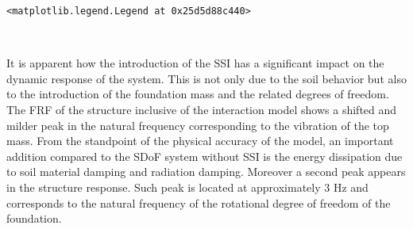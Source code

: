 \documentclass[11pt]{article}
\makeatletter
\newcommand{\boxspacing}{\kern\kvtcb@left@rule\kern\kvtcb@boxsep}
\newcommand{\prompt}[4]{
        {\ttfamily\llap{{\color{#2}[#3]:\hspace{3pt}#4}}\vspace{-\baselineskip}}
    }
\makeatother
\begin{document}
            \begin{tcolorbox}[breakable, size=fbox, boxrule=.5pt, pad at break*=1mm, opacityfill=0]
\prompt{Out}{outcolor}{5}{\boxspacing}
\begin{Verbatim}[commandchars=\\\{\}]
<matplotlib.legend.Legend at 0x25d5d88c440>
\end{Verbatim}
\end{tcolorbox}
        
    \begin{center}
    \end{center}
    { \hspace*{\fill} \\}
    
    It is apparent how the introduction of the SSI has a significant impact
on the dynamic response of the system. This is not only due to the soil
behavior but also to the introduction of the foundation mass and the
related degrees of freedom. The FRF of the structure inclusive of the
interaction model shows a shifted and milder peak in the natural
frequency corresponding to the vibration of the top mass. From the
standpoint of the physical accuracy of the model, an important addition
compared to the SDoF system without SSI is the energy dissipation due to
soil material damping and radiation damping. Moreover a second peak
appears in the structure response. Such peak is located at approximately
3 Hz and corresponds to the natural frequency of the rotational degree
of freedom of the foundation.


    
    
    
\end{document}
